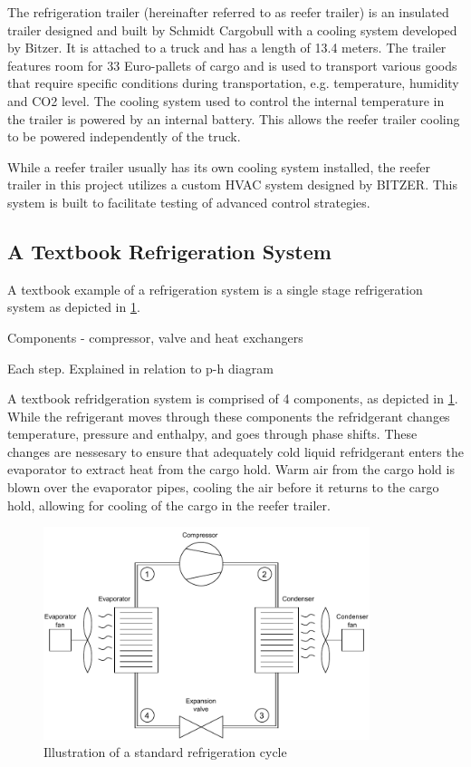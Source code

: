 The refrigeration trailer (hereinafter referred to as reefer trailer) is an insulated trailer designed and built by Schmidt Cargobull with a cooling system developed by Bitzer. It is attached to a truck and has a length of 13.4 meters. The trailer features room for 33 Euro-pallets of cargo and is used to transport various goods that require specific  conditions during transportation, e.g. temperature, humidity and CO2 level. The cooling system used to control the internal temperature in the trailer is powered by an internal battery. This allows the reefer trailer cooling to be powered independently of the truck.

While a reefer trailer usually has its own cooling system installed, the reefer trailer in this project utilizes a custom HVAC system designed by BITZER. This system is built to facilitate testing of advanced control strategies.\\

\subsection{A Textbook Refrigeration System}
A textbook example of a refrigeration system is a single stage refrigeration system as depicted in \cref{fig:HVAC_Diagram_std}.

Components - compressor, valve and heat exchangers

Each step. Explained in relation to p-h diagram


A textbook refridgeration system is comprised of 4 components, as depicted in \cref{fig:HVAC_Diagram_std}. While the refrigerant moves through these components the refridgerant changes temperature, pressure and enthalpy, and goes through phase shifts. These changes are nessesary to ensure that adequately cold liquid refridgerant enters the evaporator to extract heat from the cargo hold. Warm air from the cargo hold is blown over the evaporator pipes, cooling the air before it returns to the cargo hold, allowing for cooling of the cargo in the reefer trailer. 

\begin{figure}[h!]
	\centering
	\includegraphics[width=0.85\textwidth]{Graphics/HVAC_Diagram_std.pdf}
	\caption{Illustration of a standard refrigeration cycle}
	\label{fig:HVAC_Diagram_std}
\end{figure}

